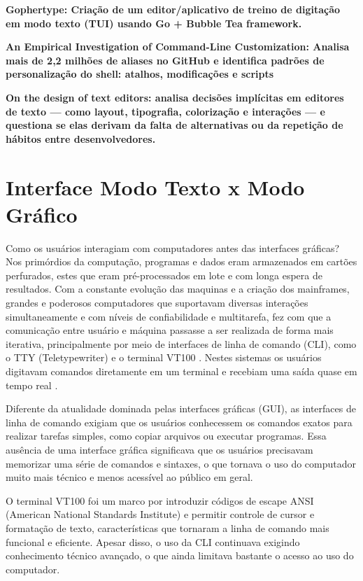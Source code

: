 \textbf{Gophertype: Criação de um editor/aplicativo de treino de digitação em modo
texto (TUI) usando Go + Bubble Tea framework. \cite{Lindroos2025}}

\textbf{An Empirical Investigation of Command-Line Customization: Analisa mais de
2,2 milhões de aliases no GitHub e identifica padrões de personalização do shell:
atalhos, modificações e scripts \cite{SchroderCito2022}}

\textbf{On the design of text editors: analisa decisões implícitas em editores de
texto — como layout, tipografia, colorização e interações — e questiona se elas derivam
da falta de alternativas ou da repetição de hábitos entre desenvolvedores.
\cite{Rougier2020Editors}}

\section{Interface Modo Texto x Modo Gráfico}

Como os usuários interagiam com computadores antes das interfaces gráficas? Nos
primórdios da computação, programas e dados eram armazenados em cartões perfurados,
estes que eram pré-processados em lote e com longa espera de resultados. Com a constante
evolução das maquinas e a criação dos mainframes, grandes e poderosos
computadores que suportavam diversas interações simultaneamente e com níveis de
confiabilidade e multitarefa, fez com que a comunicação entre usuário e máquina passasse
a ser realizada de forma mais iterativa, principalmente por meio de interfaces
de linha de comando (CLI), como o TTY (Teletypewriter) \cite{ColumbiaTeletype2023}
e o terminal VT100 \cite{DEC_VT100}. Nestes sistemas os usuários digitavam
comandos diretamente em um terminal e recebiam uma saída quase em tempo real
\cite{ComputerHistoryMuseum}.

Diferente da atualidade dominada pelas interfaces gráficas (GUI), as interfaces de
linha de comando exigiam que os usuários conhecessem os comandos exatos para realizar
tarefas simples, como copiar arquivos ou executar programas. Essa ausência de uma
interface gráfica significava que os usuários precisavam memorizar uma série de comandos
e sintaxes, o que tornava o uso do computador muito mais técnico e menos
acessível ao público em geral.

O terminal VT100 foi um marco por introduzir códigos de escape ANSI (American National
Standards Institute) e permitir controle de cursor e formatação de texto, características
que tornaram a linha de comando mais funcional e eficiente. Apesar disso, o uso da
CLI continuava exigindo conhecimento técnico avançado, o que ainda limitava
bastante o acesso ao uso do computador.


